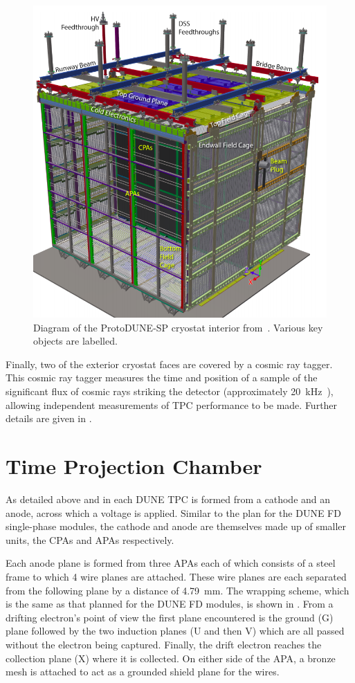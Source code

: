 \begin{figure}[h]
	\centering
	\includegraphics[width=.6\linewidth]{files/figures/protodune_detector/pdspDiag}
	\caption[Captioned diagram of the ProtoDUNE-SP cryostat interior]{Diagram of the ProtoDUNE-SP cryostat interior from~\cite{protodunePerformance}. Various key objects are labelled.}
	\label{fig:pdspDiag}
\end{figure}

Finally, two of the exterior cryostat faces are covered by a cosmic ray tagger.
This cosmic ray tagger measures the time and position of a sample of the significant flux of cosmic rays striking the detector (approximately \SI{20}{\kilo\hertz}~\cite{protodunePerformance}), allowing independent measurements of TPC performance to be made.
Further details are given in .

\section{Time Projection Chamber}
\label{sec:protodune:tpc}

As detailed above and in  each DUNE TPC is formed from a cathode and an anode, across which a voltage is applied.
Similar to the plan for the DUNE FD single-phase modules, the cathode and anode are themselves made up of smaller units, the CPAs and APAs respectively.

Each anode plane is formed from three APAs each of which consists of a steel frame to which 4 wire planes are attached.
These wire planes are each separated from the following plane by a distance of \SI{4.79}{\mm}.
The wrapping scheme, which is the same as that planned for the DUNE FD modules, is shown in .
From a drifting electron's point of view the first plane encountered is the ground (G) plane followed by the two induction planes (U and then V) which are all passed without the electron being captured.
Finally, the drift electron reaches the collection plane (X) where it is collected.
On either side of the APA, a bronze mesh is attached to act as a grounded shield plane for the wires.

